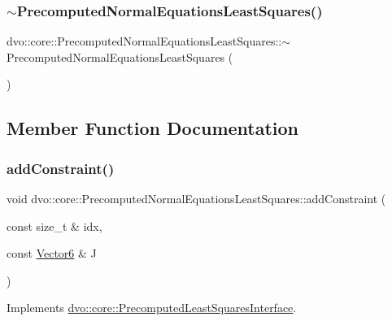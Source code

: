 \subsubsection{\texorpdfstring{$\sim$\+Precomputed\+Normal\+Equations\+Least\+Squares()}{~PrecomputedNormalEquationsLeastSquares()}}
{\footnotesize\ttfamily dvo\+::core\+::\+Precomputed\+Normal\+Equations\+Least\+Squares\+::$\sim$\+Precomputed\+Normal\+Equations\+Least\+Squares (\begin{DoxyParamCaption}{ }\end{DoxyParamCaption})\hspace{0.3cm}{\ttfamily [virtual]}}



\subsection{Member Function Documentation}
\mbox{\label{classdvo_1_1core_1_1_precomputed_normal_equations_least_squares_a8fda94e1f0b88e65f2f3c7e98597f662}} 
\subsubsection{\texorpdfstring{add\+Constraint()}{addConstraint()}}
{\footnotesize\ttfamily void dvo\+::core\+::\+Precomputed\+Normal\+Equations\+Least\+Squares\+::add\+Constraint (\begin{DoxyParamCaption}\item[{const size\+\_\+t \&}]{idx,  }\item[{const \mbox{\hyperlink{namespacedvo_1_1core_a05327f3312d32a301bce9fccda9e5807}{Vector6}} \&}]{J }\end{DoxyParamCaption})\hspace{0.3cm}{\ttfamily [virtual]}}



Implements \mbox{\hyperlink{classdvo_1_1core_1_1_precomputed_least_squares_interface_a216ce9b1040fe23557e7ef22d4369dad}{dvo\+::core\+::\+Precomputed\+Least\+Squares\+Interface}}.

\mbox{\label{classdvo_1_1core_1_1_precomputed_normal_equations_least_squares_a57b83cc3f829f4416b09d4334206a592}} 
